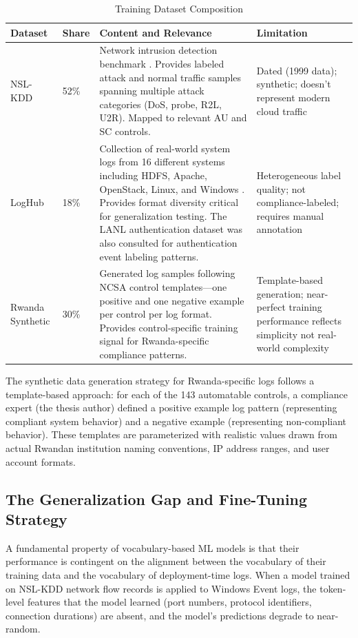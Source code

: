 \documentclass[12pt,oneside]{report}
\begin{document}
\begin{table}[H]
\centering
\caption{Training Dataset Composition}
\label{tab:dataset_composition}
\renewcommand{\arraystretch}{1.3}
\footnotesize
\begin{tabularx}{\textwidth}{|l|p{1.2cm}|X|p{3.5cm}|}
\hline
\textbf{Dataset} & \textbf{Share} & \textbf{Content and Relevance} & \textbf{Limitation} \\
\hline
NSL-KDD \cite{nslkdd} & 52\% & Network intrusion detection benchmark \cite{nslkdd}. Provides labeled attack and normal traffic samples spanning multiple attack categories (DoS, probe, R2L, U2R). Mapped to relevant AU and SC controls. & Dated (1999 data); synthetic; doesn't represent modern cloud traffic \\
\hline
LogHub \cite{loghub} & 18\% & Collection of real-world system logs from 16 different systems including HDFS, Apache, OpenStack, Linux, and Windows \cite{loghub}. Provides format diversity critical for generalization testing. The LANL authentication dataset \cite{lanl_auth} was also consulted for authentication event labeling patterns. & Heterogeneous label quality; not compliance-labeled; requires manual annotation \\
\hline
Rwanda Synthetic & 30\% & Generated log samples following NCSA control templates—one positive and one negative example per control per log format. Provides control-specific training signal for Rwanda-specific compliance patterns. & Template-based generation; near-perfect training performance reflects simplicity not real-world complexity \\
\hline
\end{tabularx}
\end{table}

The synthetic data generation strategy for Rwanda-specific logs follows a template-based approach: for each of the 143 automatable controls, a compliance expert (the thesis author) defined a positive example log pattern (representing compliant system behavior) and a negative example (representing non-compliant behavior). These templates are parameterized with realistic values drawn from actual Rwandan institution naming conventions, IP address ranges, and user account formats.

\subsection{The Generalization Gap and Fine-Tuning Strategy}

A fundamental property of vocabulary-based ML models is that their performance is contingent on the alignment between the vocabulary of their training data and the vocabulary of deployment-time logs. When a model trained on NSL-KDD network flow records is applied to Windows Event logs, the token-level features that the model learned (port numbers, protocol identifiers, connection durations) are absent, and the model's predictions degrade to near-random.
\end{document}
